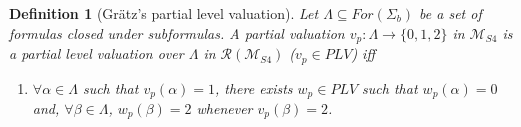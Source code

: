 \documentclass[12pt]{article}
\newtheorem{definition}[theorem]{Definition}
\newtheorem{remark}[theorem]{Remark}
\newcommand{\ipl}{\ensuremath{\mathbf{IPL}}}
\begin{document}
\begin{definition}[Gr\"atz's partial level valuation]\label{def:partial_level_val_S4}
    Let   $\Lambda \subseteq For(\Sigma_b)$ be a  set of formulas closed under subformulas. A partial valuation $v_p : \Lambda \rightarrow \{ 0, 1, 2 \}$ in $\mathcal{M}_{S4}$ is a {\em partial level valuation over $\Lambda$} in $\mathcal{R}(\mathcal{M}_{S4})$ ($v_p \in PLV$) iff

    \begin{enumerate}
        \item $\forall \alpha \in \Lambda$ such that $v_p(\alpha) = 1$, there exists $w_p\in PLV$ such that $w_p(\alpha) = 0$ and, $\forall \beta \in \Lambda$, $w_p(\beta) = 2$ whenever $v_p(\beta) = 2$.
    \end{enumerate}
\end{definition}




\end{document}
